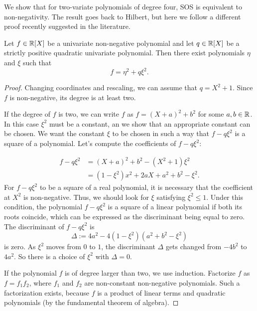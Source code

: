We show that for two-variate polynomials of degree four, SOS is equivalent to non-negativity. The result goes back to Hilbert, but here we follow a different proof recently suggested in the literature. 

\begin{lemma}
	\label{ternary:quartics:lem}
	Let $f \in \mathbb{R}[X]$ be a univariate non-negative polynomial and let $q \in \mathbb{R}[X]$ be a strictly positive quadratic univariate polynomial. Then there exist polynomials $\eta$ and $\xi$ such that 
	\[
		f = \eta^2 + q \xi^2.
	\]
\end{lemma}
\begin{proof}
	Changing coordinates and rescaling, we can assume that $q = X^2 + 1$. Since $f$ is non-negative, its degree is at least two. 
	
	If the degree of $f$ is two, we can write $f$ as $f = (X+a)^2 + b^2$ for some $a,b \in \mathbb{R}$. In this case $\xi^2$ must be a constant, an we show that an appropriate constant can be chosen. We want the constant $\xi$ to be chosen in such a way that $f- q\xi^2$ is a square of a polynomial. Let's compute the coefficients of $f-q \xi^2$:
	
	\begin{align*}
		f - q \xi^2 & = (X+a)^2 + b^2 - (X^2 + 1) \xi^2 
		\\ & = (1-\xi^2) x^2 + 2 a X + a^2 + b^2 - \xi^2.
	\end{align*}
	For $f-q \xi^2$ to be a square of a real polynomial, it is necessary that the coefficient at $X^2$ is non-negative. Thus, we should look for $\xi$ satisfying  $\xi^2 \le 1$. Under this condition, the polynomial $f- q \xi^2$ is a square of a linear polynomial if both its roots coincide, which can be expressed as the discriminant being equal to zero. The discriminant of $f - q \xi^2$ is 
	\[
		\Delta := 4 a^2 - 4 (1-\xi^2) (a^2 + b^2 -\xi^2)
	\] is zero. As $\xi^2$ moves from $0$ to $1$, the discriminant $\Delta$ gets changed from $- 4 b^2$ to $4 a^2$. So there is a choice of $\xi^2$ with $\Delta=0$. 
	
	If the polynomial $f$ is of degree larger than two, we use induction. Factorize $f$ as $f=f_1 f_2$, where $f_1$ and $f_2$ are non-constant non-negative polynomials. Such a factorization exists, because $f$ is a product of linear terms and quadratic polynomials (by the fundamental theorem of algebra).
	

\end{proof}

